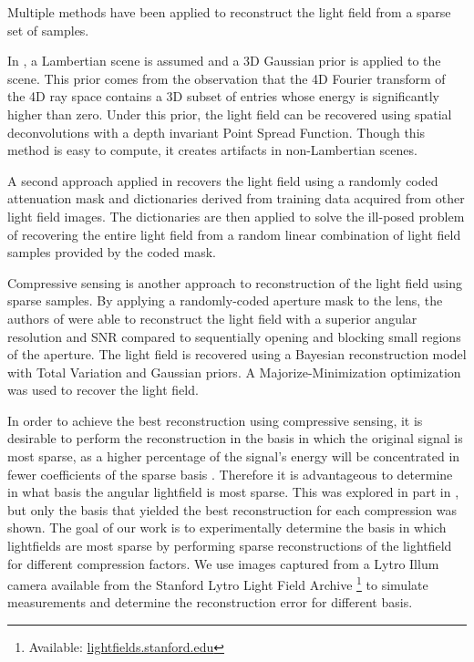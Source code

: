 \documentclass[10pt,twocolumn,letterpaper]{article}
\begin{document}
Multiple methods have been applied to reconstruct the light field from a sparse set of samples. 

In \cite{DimGapLFPrior}, a Lambertian scene is assumed and a 3D Gaussian prior is applied to the scene. This prior comes from the observation that the 4D Fourier transform of the 4D ray space contains a 3D subset of entries whose energy is significantly higher than zero. Under this prior, the light field can be recovered using spatial deconvolutions with a depth invariant Point Spread Function. Though this method is easy to compute, it creates artifacts in non-Lambertian scenes.

A second approach applied in \cite{LFDict} recovers the light field using a randomly coded attenuation mask and dictionaries derived from training data acquired from other light field images. The dictionaries are then applied to solve the ill-posed problem of recovering the entire light field from a random linear combination of light field samples provided by the coded mask.

Compressive sensing \cite{IntroCS}\cite{CompressiveSensingMega} is another approach to reconstruction of the light field using sparse samples. By applying a randomly-coded aperture mask to the lens, the authors of \cite{SparsityInCFD} were able to reconstruct the light field with a superior angular resolution and SNR compared to sequentially opening and blocking small regions of the aperture. The light field is recovered using a Bayesian reconstruction model with Total Variation and Gaussian priors. A Majorize-Minimization optimization was used to recover the light field.

In order to achieve the best reconstruction using compressive sensing, it is desirable to perform the reconstruction in the basis in which the original signal is most sparse, as a higher percentage of the signal's energy will be concentrated in fewer coefficients of the sparse basis \cite{CompressiveSensingMega}. Therefore it is advantageous to determine in what basis the angular lightfield is most sparse. This was explored in part in \cite{mainP1}, but only the basis that yielded the best reconstruction for each compression was shown. The goal of our work is to experimentally determine the basis in which lightfields are most sparse by performing sparse reconstructions of the lightfield for different compression factors. We use images captured from a Lytro Illum camera available from the Stanford Lytro Light Field Archive \footnote{Available: \url{lightfields.stanford.edu}} to simulate measurements and determine the reconstruction error for different basis.
\end{document}
